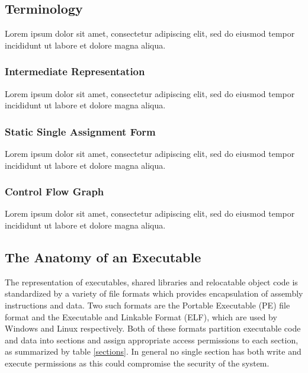 \documentclass[12pt, a4paper]{article}
\begin{document}

\subsection{Terminology}

Lorem ipsum dolor sit amet, consectetur adipiscing elit, sed do eiusmod tempor incididunt ut labore et dolore magna aliqua.


\subsubsection{Intermediate Representation}

Lorem ipsum dolor sit amet, consectetur adipiscing elit, sed do eiusmod tempor incididunt ut labore et dolore magna aliqua.


\subsubsection{Static Single Assignment Form}

Lorem ipsum dolor sit amet, consectetur adipiscing elit, sed do eiusmod tempor incididunt ut labore et dolore magna aliqua.

\cite{ssa_decomp}


\subsubsection{Control Flow Graph}

Lorem ipsum dolor sit amet, consectetur adipiscing elit, sed do eiusmod tempor incididunt ut labore et dolore magna aliqua.


\subsection{The Anatomy of an Executable}

The representation of executables, shared libraries and relocatable object code is standardized by a variety of file formats which provides encapsulation of assembly instructions and data. Two such formats are the Portable Executable (PE) file format and the Executable and Linkable Format (ELF), which are used by Windows and Linux respectively. Both of these formats partition executable code and data into sections and assign appropriate access permissions to each section, as summarized by table \ref{sections}. In general no single section has both write and execute permissions as this could compromise the security of the system.
\end{document}
